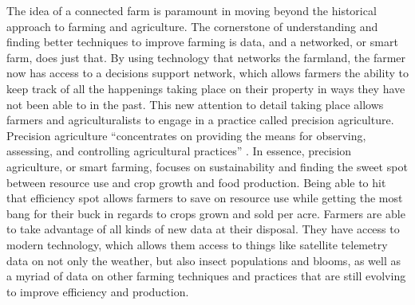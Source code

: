 \documentclass[sigconf]{acmart}
\begin{document}
The idea of a connected farm is paramount in moving beyond the historical approach to farming and agriculture. The cornerstone of understanding and finding better techniques to improve farming is data, and a networked, or smart farm, does just that. By using technology that networks the farmland, the farmer now has access to a decisions support network, which allows farmers the ability to keep track of all the happenings taking place on their property in ways they have not been able to in the past. This new attention to detail taking place allows farmers and agriculturalists to engage in a practice called precision agriculture. Precision agriculture ``concentrates on providing the means for observing, assessing, and controlling agricultural practices'' \cite{kassim2014}. In essence, precision agriculture, or smart farming, focuses on sustainability and finding the sweet spot between resource use and crop growth and food production. Being able to hit that efficiency spot allows farmers to save on resource use while getting the most bang for their buck in regards to crops grown and sold per acre. Farmers are able to take advantage of all kinds of new data at their disposal. They have access to modern technology, which allows them access to things like satellite telemetry data on not only the weather, but also insect populations and blooms, as well as a myriad of data on other farming techniques and practices that are still evolving to improve efficiency and production.
\end{document}

